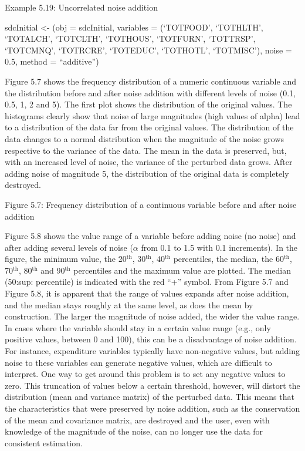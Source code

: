 \documentclass[letterpaper,10pt,english]{sphinxmanual}
\begin{document}
Example 5.19: Uncorrelated noise addition

sdcInitial \textless{}- (obj = sdcInitial, variables =
(‘TOTFOOD’, ‘TOTHLTH’, ‘TOTALCH’, ‘TOTCLTH’, ‘TOTHOUS’,
‘TOTFURN’, ‘TOTTRSP’, ‘TOTCMNQ’, ‘TOTRCRE’, ‘TOTEDUC’, ‘TOTHOTL’,
‘TOTMISC’), noise = 0.5, method = “additive”)

Figure 5.7 shows the frequency distribution of a numeric continuous
variable and the distribution before and after noise addition with
different levels of noise (0.1, 0.5, 1, 2 and 5). The first plot shows
the distribution of the original values. The histograms clearly show
that noise of large magnitudes (high values of alpha) lead to a
distribution of the data far from the original values. The distribution
of the data changes to a normal distribution when the magnitude of the
noise grows respective to the variance of the data. The mean in the data
is preserved, but, with an increased level of noise, the variance of the
perturbed data grows. After adding noise of magnitude 5, the
distribution of the original data is completely destroyed.

\noindent{}

Figure 5.7: Frequency distribution of a continuous variable before and
after noise addition

Figure 5.8 shows the value range of a variable before adding noise (no
noise) and after adding several levels of noise (\(\alpha\) from 0.1
to 1.5 with 0.1 increments). In the figure, the minimum value, the
20$^{\text{th}}$, 30$^{\text{th}}$, 40$^{\text{th}}$ percentiles, the median, the
60$^{\text{th}}$, 70$^{\text{th}}$, 80$^{\text{th}}$ and 90$^{\text{th}}$
percentiles and the maximum value are plotted. The median (50:sup:
percentile) is indicated with the red “+” symbol. From Figure 5.7 and
Figure 5.8, it is apparent that the range of values expands after noise
addition, and the median stays roughly at the same level, as does the
mean by construction. The larger the magnitude of noise added, the wider
the value range. In cases where the variable should stay in a certain
value range (e.g., only positive values, between 0 and 100), this can be
a disadvantage of noise addition. For instance, expenditure variables
typically have non-negative values, but adding noise to these variables
can generate negative values, which are difficult to interpret. One way
to get around this problem is to set any negative values to zero. This
truncation of values below a certain threshold, however, will distort
the distribution (mean and variance matrix) of the perturbed data. This
means that the characteristics that were preserved by noise addition,
such as the conservation of the mean and covariance matrix, are
destroyed and the user, even with knowledge of the magnitude of the
noise, can no longer use the data for consistent estimation.
\end{document}
